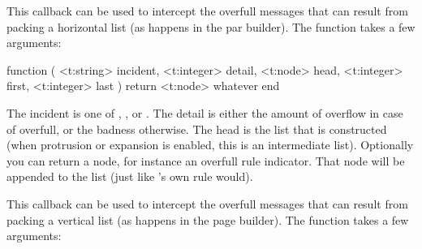 \stopsubsection

\startsubsection[title=tail_append]





\stopsubsection

\stopsection

\startsection[title=Tracing]

\startsubsection[title=hpack_quality]

This callback can be used to intercept the overfull messages that can result from
packing a horizontal list (as happens in the par builder). The function takes a
few arguments:

\starttyping[option=LUA]
function (
    <t:string>  incident,
    <t:integer> detail,
    <t:node>    head,
    <t:integer> first,
    <t:integer> last
 )
    return <t:node> whatever
end
\stoptyping

The incident is one of , ,  or
. The detail is either the amount of overflow in case of \type
{overfull}, or the badness otherwise. The head is the list that is constructed
(when protrusion or expansion is enabled, this is an intermediate list).
Optionally you can return a node, for instance an overfull rule indicator. That
node will be appended to the list (just like \TEX's own rule would).

\stopsubsection

\startsubsection[title=vpack_quality]

This callback can be used to intercept the overfull messages that can result from
packing a vertical list (as happens in the page builder). The function takes a
few arguments:


